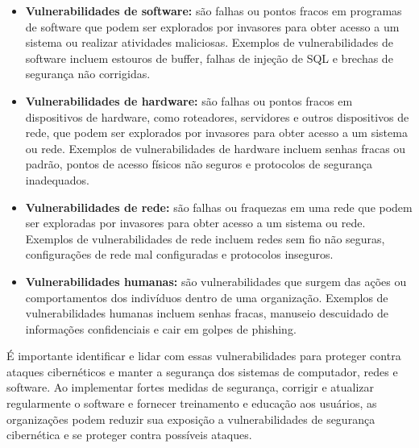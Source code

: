 \begin{itemize}
  \item \textbf{Vulnerabilidades de software: }são falhas ou pontos fracos em programas de software que podem ser explorados por invasores para obter acesso a um sistema ou realizar atividades maliciosas. Exemplos de vulnerabilidades de software incluem estouros de buffer, falhas de injeção de SQL e brechas de segurança não corrigidas.
  \item \textbf{Vulnerabilidades de hardware: }são falhas ou pontos fracos em dispositivos de hardware, como roteadores, servidores e outros dispositivos de rede, que podem ser explorados por invasores para obter acesso a um sistema ou rede. Exemplos de vulnerabilidades de hardware incluem senhas fracas ou padrão, pontos de acesso físicos não seguros e protocolos de segurança inadequados.
  \item \textbf{Vulnerabilidades de rede: }são falhas ou fraquezas em uma rede que podem ser exploradas por invasores para obter acesso a um sistema ou rede. Exemplos de vulnerabilidades de rede incluem redes sem fio não seguras, configurações de rede mal configuradas e protocolos inseguros.
  \item \textbf{Vulnerabilidades humanas: }são vulnerabilidades que surgem das ações ou comportamentos dos indivíduos dentro de uma organização. Exemplos de vulnerabilidades humanas incluem senhas fracas, manuseio descuidado de informações confidenciais e cair em golpes de phishing.
\end{itemize}

É importante identificar e lidar com essas vulnerabilidades para proteger contra ataques cibernéticos e manter a segurança dos sistemas de computador, redes e software. Ao implementar fortes medidas de segurança, corrigir e atualizar regularmente o software e fornecer treinamento e educação aos usuários, as organizações podem reduzir sua exposição a vulnerabilidades de segurança cibernética e se proteger contra possíveis ataques.

\newpage
